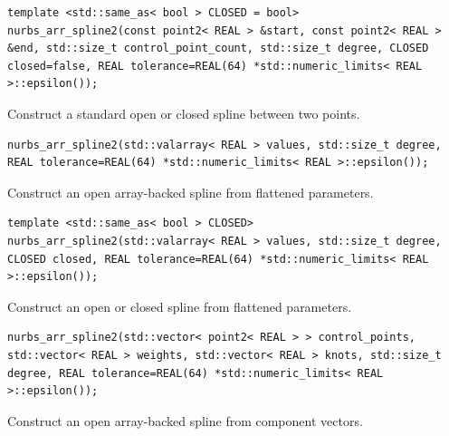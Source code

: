\par\noindent\begin{minipage}{\linewidth}
\begin{lstlisting}[style=apireference]
template <std::same_as< bool > CLOSED = bool>
nurbs_arr_spline2(const point2< REAL > &start, const point2< REAL > &end, std::size_t control_point_count, std::size_t degree, CLOSED closed=false, REAL tolerance=REAL(64) *std::numeric_limits< REAL >::epsilon());
\end{lstlisting}
{\footnotesize Construct a standard open or closed spline between two points.\par}
\end{minipage}\par\vspace{1pt}
\par\noindent\begin{minipage}{\linewidth}
\begin{lstlisting}[style=apireference]
nurbs_arr_spline2(std::valarray< REAL > values, std::size_t degree, REAL tolerance=REAL(64) *std::numeric_limits< REAL >::epsilon());
\end{lstlisting}
{\footnotesize Construct an open array-backed spline from flattened parameters.\par}
\end{minipage}\par\vspace{1pt}
\par\noindent\begin{minipage}{\linewidth}
\begin{lstlisting}[style=apireference]
template <std::same_as< bool > CLOSED>
nurbs_arr_spline2(std::valarray< REAL > values, std::size_t degree, CLOSED closed, REAL tolerance=REAL(64) *std::numeric_limits< REAL >::epsilon());
\end{lstlisting}
{\footnotesize Construct an open or closed spline from flattened parameters.\par}
\end{minipage}\par\vspace{1pt}
\par\noindent\begin{minipage}{\linewidth}
\begin{lstlisting}[style=apireference]
nurbs_arr_spline2(std::vector< point2< REAL > > control_points, std::vector< REAL > weights, std::vector< REAL > knots, std::size_t degree, REAL tolerance=REAL(64) *std::numeric_limits< REAL >::epsilon());
\end{lstlisting}
{\footnotesize Construct an open array-backed spline from component vectors.\par}
\end{minipage}\par\vspace{1pt}

